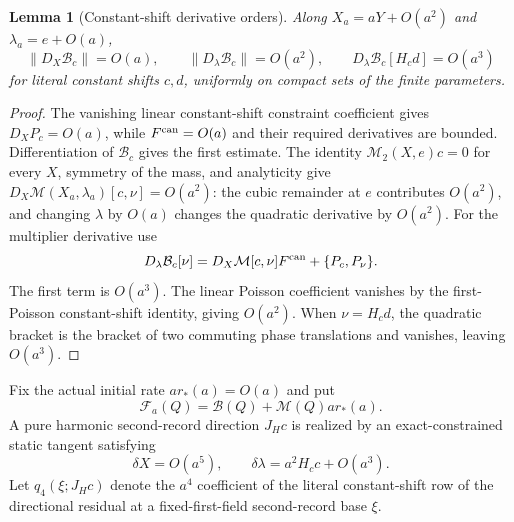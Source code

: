 \documentclass[11pt]{article}
\numberwithin{equation}{section}
\newtheorem{lemma}[lemma]{Lemma}
\theoremstyle{definition}
\theoremstyle{remark}
\begin{document}
\begin{lemma}[Constant-shift derivative orders]
\label{lem:supp-exact-ward-orders}
Along $X_a=aY+O(a^2)$ and $\lambda_a=e+O(a)$,
\begin{equation}
 \|D_X\mathcal B_c\|=O(a),\qquad
 \|D_\lambda\mathcal B_c\|=O(a^2),
 \qquad
 D_\lambda\mathcal B_c[H_cd]=O(a^3)
 \label{eq:supp-exact-ward-orders}
\end{equation}
for literal constant shifts $c,d$, uniformly on compact sets of the finite
parameters.
\end{lemma}
\begin{proof}
The vanishing linear constant-shift constraint coefficient gives
$D_XP_c=O(a)$, while $F^{\rm can}=O(a)$ and their required derivatives
are bounded.  Differentiation of $\mathcal B_c$ gives the first estimate.
The identity $\mathcal M_2(X,e)c=0$ for every $X$, symmetry of the mass,
and analyticity give
$D_X\mathcal M(X_a,\lambda_a)[c,\nu]=O(a^2)$:
the cubic remainder at $e$ contributes $O(a^2)$, and changing
$\lambda$ by $O(a)$ changes the quadratic derivative by $O(a^2)$.
For the multiplier derivative use
\[
 D_\lambda\mathcal B_c[\nu]
 =D_X\mathcal M[c,\nu]F^{\rm can}+\{P_c,P_\nu\}.
\]
The first term is $O(a^3)$.  The linear Poisson coefficient vanishes by the
first-Poisson constant-shift identity, giving $O(a^2)$.  When
$\nu=H_cd$, the quadratic bracket is the bracket of two commuting phase
translations and vanishes, leaving $O(a^3)$.
\end{proof}

Fix the actual initial rate $ar_*(a)=O(a)$ and put
\begin{equation}
 \mathcal F_a(Q)=\mathcal B(Q)+\mathcal M(Q)ar_*(a).
 \label{eq:supp-exact-fixed-target-residual}
\end{equation}
A pure harmonic second-record direction $J_Hc$ is realized by an
exact-constrained static tangent satisfying
\begin{equation}
 \delta X=O(a^5),\qquad
 \delta\lambda=a^2H_cc+O(a^3).
 \label{eq:supp-exact-pure-harmonic-ray}
\end{equation}
Let $q_4(\xi;J_Hc)$ denote the $a^4$ coefficient of the literal
constant-shift row of the directional residual at a fixed-first-field
second-record base $\xi$.
\end{document}
